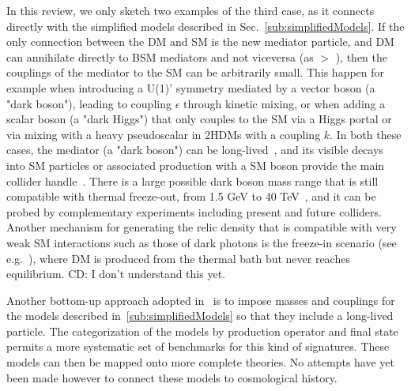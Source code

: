 In this review, we only sketch two examples of the third case, as it connects directly with the simplified models described in Sec.~\ref{sub:simplifiedModels}. If the only connection between the DM and SM is the new mediator particle, and DM can annihilate directly to BSM mediators and not viceversa (as \mdm $>$ \mmed), then the couplings of the mediator to the SM can be arbitrarily small. This happen for example when introducing a U(1)' symmetry mediated by a vector boson (a "dark boson"), leading to coupling $\epsilon$ through kinetic mixing, or when adding a scalar boson (a "dark Higgs") that only couples to the SM via a Higgs portal or via mixing with a heavy pseudoscalar in 2HDMs with a coupling $k$. 
In both these cases, the mediator (a "dark boson") can be long-lived~\cite{Pospelov:2007mp}, and its visible decays into SM particles or associated production with a SM boson provide the main collider handle~\cite{Curtin:2014cca}. 
There is a large possible dark boson mass range that is still compatible with thermal freeze-out, from 1.5 GeV to 40 TeV~\cite{Das:2010ts}, and it can be probed by complementary experiments including present and future colliders. Another mechanism for generating the relic density that is compatible with very weak SM  interactions such as those of dark photons is the freeze-in scenario (see e.g.~\cite{Co:2015pka,Bernal:2017kxu}), where DM is produced from the thermal bath but never reaches equilibrium. CD: I don't understand this yet. 

Another bottom-up approach adopted in~\cite{Buchmueller:2017uqu} is to impose masses and couplings for the models described in~\ref{sub:simplifiedModels} so that they include a long-lived particle. The categorization of the models by production operator and final state permits a more systematic set of benchmarks for this kind of signatures. These models can then be mapped onto more complete theories. No attempts have yet been made however to connect these models to cosmological history. 
